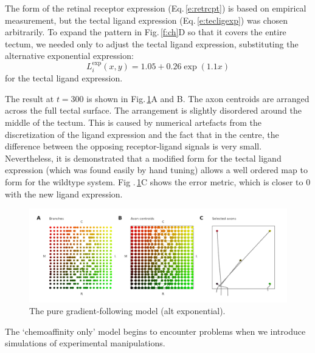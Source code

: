 \documentclass[11pt, a4paper]{article}
\begin{document}
The form of the retinal receptor expression (Eq.\,\ref{e:retrcpt}) is based on
empirical measurement, but the tectal ligand expression
(Eq.\,\ref{e:tecligexp}) was chosen arbitrarily. To expand the pattern in
Fig.\,\ref{f:ch}D so that it covers the entire tectum, we needed only to
adjust the tectal ligand expression, substituting the alternative exponential
expression:
%
\begin{equation} \label{e:tecligexp2}
L_i^{\text{exp}}(x,y) = 1.05 + 0.26 \exp(1.1 x)
\end{equation}
%
for the tectal ligand expression.

The result at $t=300$ is shown in Fig.\,\ref{f:chalt}A and B. The axon
centroids are arranged across the full tectal surface.  The arrangement is
slightly disordered around the middle of the tectum. This is caused by
numerical artefacts from the discretization of the ligand expression and the
fact that in the centre, the difference between the opposing receptor-ligand
signals is very small. Nevertheless, it is demonstrated that a modified form
for the tectal ligand expression (which was found easily by hand tuning)
allows a well ordered map to form for the wildtype system. Fig
.\,\ref{f:chalt}C shows the error metric, which is closer to 0 with the new
ligand expression.

\begin{figure}
\includegraphics[width=\linewidth]{./images/j4_eE_G_wt_fig3.png}
\caption{The pure gradient-following model (alt exponential).}
\label{f:chalt}
\end{figure}

The `chemoaffinity only' model begins to encounter problems when we introduce
simulations of experimental manipulations.
\end{document}
